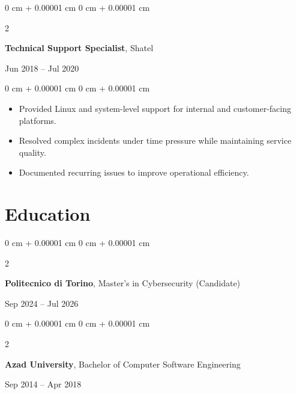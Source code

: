 \documentclass[10pt, letterpaper]{article}
\newenvironment{highlights}{
    \begin{itemize}[
        topsep=0.10 cm,
        parsep=0.10 cm,
        partopsep=0pt,
        itemsep=0pt,
        leftmargin=0 cm + 10pt
    ]
}{
    \end{itemize}
} %
\newenvironment{onecolentry}{
    \begin{adjustwidth}{
        0 cm + 0.00001 cm
    }{
        0 cm + 0.00001 cm
    }
}{
    \end{adjustwidth}
} %
\newenvironment{twocolentry}[2][]{
    \onecolentry
    \def\secondColumn{#2}
    \setcolumnwidth{\fill, 4.5 cm}
    \begin{paracol}{2}
}{
    \switchcolumn \raggedleft \secondColumn
    \end{paracol}
    \endonecolentry
} %
\begin{document}
                \vspace{0.2 cm}

                \begin{twocolentry}{Jun 2018 -- Jul 2020}
                    \textbf{Technical Support Specialist}, Shatel
                \end{twocolentry}
                \vspace{0.10 cm}
                \begin{onecolentry}
                    \begin{highlights}
                        \item Provided Linux and system-level support for internal and customer-facing platforms.
                        \item Resolved complex incidents under time pressure while maintaining service quality.
                        \item Documented recurring issues to improve operational efficiency.
                    \end{highlights}
                \end{onecolentry}

            \section{Education}
                \begin{twocolentry}{Sep 2024 -- Jul 2026}
                    \textbf{Politecnico di Torino}, Master's in Cybersecurity (Candidate)
                \end{twocolentry}

                \vspace{0.10 cm}
                \begin{twocolentry}{Sep 2014 -- Apr 2018}
                    \textbf{Azad University}, Bachelor of Computer Software Engineering
                \end{twocolentry}
\end{document}
